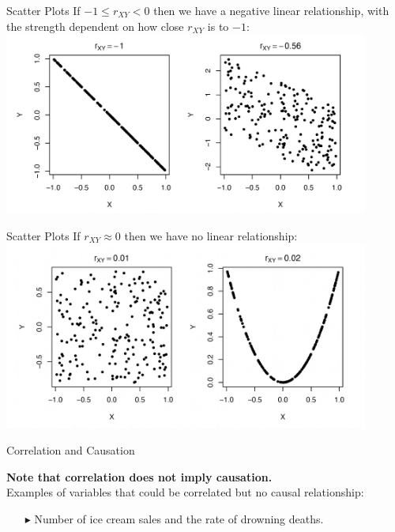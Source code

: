\documentclass[12pt]{beamer}
\begin{document}
\begin{frame}{Scatter Plots}
	If $-1\le r_{XY}<0$ then we have a negative linear relationship, with the strength dependent on how close $r_{XY}$ is to $-1$:
	\centering
	\includegraphics[width=12cm]{scatter2.png}
\end{frame}
\begin{frame}{Scatter Plots}
	If $r_{XY}\approx0$ then we have no linear relationship:
	\centering
	\includegraphics[width=12cm]{scatter3.png}
\end{frame}
\begin{frame}{Correlation and Causation}
	
{\bf\color{red}Note that correlation does not imply causation.}\medskip\\
Examples of variables that could be correlated but no causal relationship:
\begin{itemize}
	\item[$\blacktriangleright$] Number of ice cream sales and the rate of drowning deaths.
\end{itemize}
\end{frame}
\end{document}
